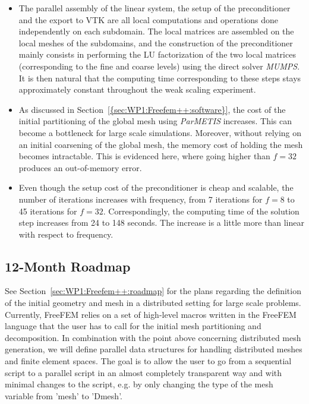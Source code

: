 \begin{itemize}
\item The parallel assembly of the linear system, the setup of the preconditioner and the export to VTK are all local computations and operations done independently on each subdomain. The local matrices are assembled on the local meshes of the subdomains, and the construction of the preconditioner mainly consists in performing the LU factorization of the two local matrices (corresponding to the fine and coarse levels) using the direct solver \textit{MUMPS}. It is then natural that the computing time corresponding to these steps stays approximately constant throughout the weak scaling experiment.
\item As discussed in Section~\cref{{sec:WP1:Freefem++:software}}, the cost of the initial partitioning of the global mesh using \textit{ParMETIS} increases. This can become a bottleneck for large scale simulations. Moreover, without relying on an initial coarsening of the global mesh, the memory cost of holding the mesh becomes intractable. This is evidenced here, where going higher than $f=32$ produces an out-of-memory error.
\item Even though the setup cost of the preconditioner is cheap and scalable, the number of iterations increases with frequency, from 7 iterations for $f=8$ to 45 iterations for $f=32$. Correspondingly, the computing time of the solution step increases from 24 to 148 seconds. The increase is a little more than linear with respect to frequency.
\end{itemize}

\subsection{12-Month Roadmap}
\label{sec:WP3:Freefem++:roadmap}

See Section~\cref{sec:WP1:Freefem++:roadmap} for the plans regarding the definition of the initial geometry and mesh in a distributed setting for large scale problems.\\

Currently, FreeFEM relies on a set of high-level macros written in the FreeFEM language that the user has to call for the initial mesh partitioning and decomposition. In combination with the point above concerning distributed mesh generation, we will define parallel data structures for handling distributed meshes and finite element spaces. The goal is to allow the user to go from a sequential script to a parallel script in an almost completely transparent way and with minimal changes to the script, e.g. by only changing the type of the mesh variable from 'mesh' to 'Dmesh'.\\

